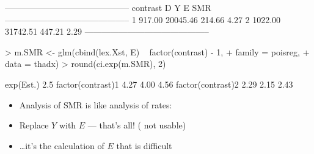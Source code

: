 \begin{frame}[fragile]
\begin{Schunk}
\begin{Soutput}
 -------------------------------------------- 
 contrast         D        Y       E     SMR  
 -------------------------------------------- 
 1           917.00 20045.46  214.66    4.27  
 2          1022.00 31742.51  447.21    2.29  
 -------------------------------------------- 
\end{Soutput}
\end{Schunk}
\vspace*{-1em}
\begin{Schunk}
\begin{Sinput}
> m.SMR <- glm(cbind(lex.Xst, E) ~ factor(contrast) - 1,
+              family = poisreg,
+                data = thadx)
> round(ci.exp(m.SMR), 2)
\end{Sinput}
\begin{Soutput}
                  exp(Est.) 2.5%
factor(contrast)1      4.27 4.00  4.56
factor(contrast)2      2.29 2.15  2.43
\end{Soutput}
\end{Schunk}
\pause
\begin{itemize}[<+->]
\item Analysis of SMR is like analysis of rates:
\item Replace $Y$ with $E$ --- that's all! ( not usable)
\item \ldots it's the calculation of $E$ that is difficult
\end{itemize}
\end{frame}

